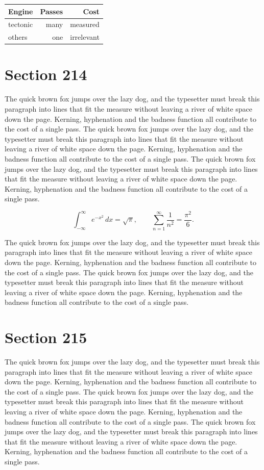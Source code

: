 \documentclass{article}
\begin{document}
\begin{center}
\begin{tabular}{lrr}
\toprule
Engine & Passes & Cost \\
\midrule
tectonic & many & measured \\
others & one & irrelevant \\
\bottomrule
\end{tabular}
\end{center}

\section{Section 214}
The quick brown fox jumps over the lazy dog, and the typesetter must break this paragraph into lines that fit the measure without leaving a river of white space down the page. Kerning, hyphenation and the badness function all contribute to the cost of a single pass. The quick brown fox jumps over the lazy dog, and the typesetter must break this paragraph into lines that fit the measure without leaving a river of white space down the page. Kerning, hyphenation and the badness function all contribute to the cost of a single pass. The quick brown fox jumps over the lazy dog, and the typesetter must break this paragraph into lines that fit the measure without leaving a river of white space down the page. Kerning, hyphenation and the badness function all contribute to the cost of a single pass. 

\begin{equation}
\int_{-\infty}^{\infty} e^{-x^{2}}\,dx = \sqrt{\pi}, \qquad
\sum_{n=1}^{\infty} \frac{1}{n^{2}} = \frac{\pi^{2}}{6}.
\end{equation}

The quick brown fox jumps over the lazy dog, and the typesetter must break this paragraph into lines that fit the measure without leaving a river of white space down the page. Kerning, hyphenation and the badness function all contribute to the cost of a single pass. The quick brown fox jumps over the lazy dog, and the typesetter must break this paragraph into lines that fit the measure without leaving a river of white space down the page. Kerning, hyphenation and the badness function all contribute to the cost of a single pass. 
\section{Section 215}
The quick brown fox jumps over the lazy dog, and the typesetter must break this paragraph into lines that fit the measure without leaving a river of white space down the page. Kerning, hyphenation and the badness function all contribute to the cost of a single pass. The quick brown fox jumps over the lazy dog, and the typesetter must break this paragraph into lines that fit the measure without leaving a river of white space down the page. Kerning, hyphenation and the badness function all contribute to the cost of a single pass. The quick brown fox jumps over the lazy dog, and the typesetter must break this paragraph into lines that fit the measure without leaving a river of white space down the page. Kerning, hyphenation and the badness function all contribute to the cost of a single pass. 
\end{document}
